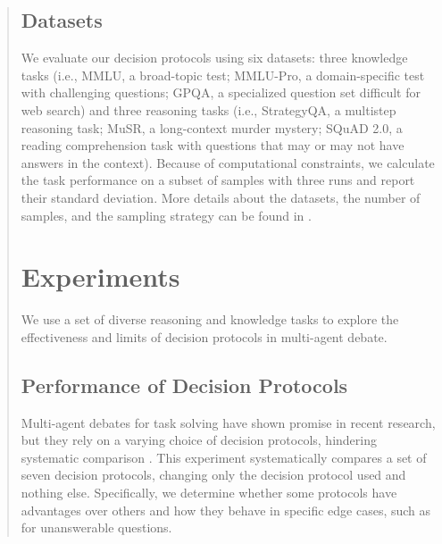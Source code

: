 \documentclass[11pt]{article}
\begin{document}
\begin{abstract}
\subsection{Datasets}
\label{sec:datasets_main}

We evaluate our decision protocols using six datasets: three knowledge tasks (i.e., MMLU, a broad-topic test; MMLU-Pro, a domain-specific test with challenging questions; GPQA, a specialized question set difficult for web search) and three reasoning tasks (i.e., StrategyQA, a multistep reasoning task; MuSR, a long-context murder mystery; SQuAD 2.0, a reading comprehension task with questions that may or may not have answers in the context).
Because of computational constraints, we calculate the task performance on a subset of samples with three runs and report their standard deviation.
More details about the datasets, the number of samples, and the sampling strategy can be found in .













\section{Experiments}
We use a set of diverse reasoning and knowledge tasks to explore the effectiveness and limits of decision protocols in multi-agent debate.


\subsection{Performance of Decision Protocols}
\label{sec:experiment1}

Multi-agent debates for task solving have shown promise in recent research, but they rely on a varying choice of decision protocols, hindering systematic comparison \citep{yin_exchange--thought_2023, chen_reconcile_2024}. 
This experiment systematically compares a set of seven decision protocols, changing only the decision protocol used and nothing else.
Specifically, we determine whether some protocols have advantages over others and how they behave in specific edge cases, such as for unanswerable questions.


\end{abstract}
\end{document}
